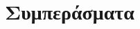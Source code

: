 \chapter{\label{summary}Συμπεράσματα}

\setcounter{equation}{0}
\setcounter{table}{0}
\setcounter{figure}{0}
